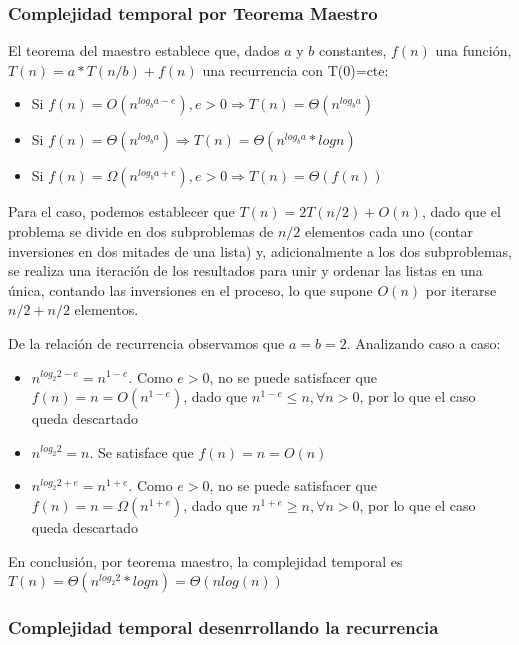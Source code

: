 \documentclass[titlepage,a4paper]{article}
\begin{document}
\subsubsection{Complejidad temporal por Teorema Maestro}
\label{sec:org717e075}

El teorema del maestro establece que, dados \(a\) y \(b\) constantes, \(f(n)\) una función, \(T(n) = a * T(n/b) + f(n)\) una recurrencia con T(0)=cte:
\begin{itemize}
\item Si \(f(n) = O(n^{log_b a - e}), e > 0 \Rightarrow T(n) = \Theta(n^{log_b a})\)
\item Si \(f(n) = \Theta(n^{log_b a}) \Rightarrow T(n) = \Theta(n^{log_b a} * log n)\)
\item Si \(f(n) = \Omega(n^{log_b a + e}), e > 0 \Rightarrow T(n) = \Theta(f(n))\)
\end{itemize}

Para el caso, podemos establecer que \(T(n) = 2 T(n/2) + O(n)\), dado que el problema se divide en dos subproblemas de \(n/2\) elementos cada uno (contar inversiones en dos mitades de una lista) y, adicionalmente a los dos subproblemas, se realiza una iteración de los resultados para unir y ordenar las listas en una única, contando las inversiones en el proceso, lo que supone \(O(n)\) por iterarse \(n/2+n/2\) elementos.

De la relación de recurrencia observamos que \(a=b=2\). Analizando caso a caso:
\begin{itemize}
\item \(n^{log_2 2 - e} = n^{1 - e}\). Como \(e > 0\), no se puede satisfacer que \(f(n) = n = O(n^{1-e})\), dado que \(n^{1-e} \leq n, \forall n > 0\), por lo que el caso queda descartado
\item \(n^{log_2 2} = n\). Se satisface que \(f(n) = n = O(n)\)
\item \(n^{log_2 2 + e} = n^{1 + e}\). Como \(e > 0\), no se puede satisfacer que \(f(n) = n = \Omega(n^{1+e})\), dado que \(n^{1+e} \geq n, \forall n > 0\), por lo que el caso queda descartado
\end{itemize}

En conclusión, por teorema maestro, la complejidad temporal es \(T(n) = \Theta(n^{log_2 2} * log n) = \Theta(n log(n))\)

\subsubsection{Complejidad temporal desenrrollando la recurrencia}
\label{sec:org00f68be}
\end{document}
